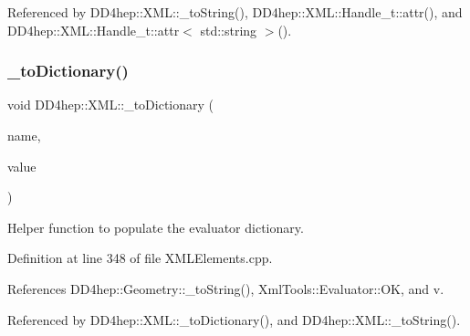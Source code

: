 Referenced by D\+D4hep\+::\+X\+M\+L\+::\+\_\+to\+String(), D\+D4hep\+::\+X\+M\+L\+::\+Handle\+\_\+t\+::attr(), and D\+D4hep\+::\+X\+M\+L\+::\+Handle\+\_\+t\+::attr$<$ std\+::string $>$().

\hypertarget{group___d_d4_h_e_p___x_m_l_ga453206d36ab8257b39337846e5a1795d}{}\label{group___d_d4_h_e_p___x_m_l_ga453206d36ab8257b39337846e5a1795d} 
\subsubsection{\texorpdfstring{\+\_\+to\+Dictionary()}{\_toDictionary()}\hspace{0.1cm}{\footnotesize\ttfamily [1/4]}}
{\footnotesize\ttfamily void D\+D4hep\+::\+X\+M\+L\+::\+\_\+to\+Dictionary (\begin{DoxyParamCaption}\item[{const \hyperlink{namespace_d_d4hep_1_1_x_m_l_a09e5d9cc86ed782f6826dfe0778c1815}{Xml\+Char} $\ast$}]{name,  }\item[{const \hyperlink{namespace_d_d4hep_1_1_x_m_l_a09e5d9cc86ed782f6826dfe0778c1815}{Xml\+Char} $\ast$}]{value }\end{DoxyParamCaption})}



Helper function to populate the evaluator dictionary. 



Definition at line 348 of file X\+M\+L\+Elements.\+cpp.



References D\+D4hep\+::\+Geometry\+::\+\_\+to\+String(), Xml\+Tools\+::\+Evaluator\+::\+OK, and v.



Referenced by D\+D4hep\+::\+X\+M\+L\+::\+\_\+to\+Dictionary(), and D\+D4hep\+::\+X\+M\+L\+::\+\_\+to\+String().

\hypertarget{group___d_d4_h_e_p___x_m_l_ga50eac63a7d1b9077d329298a55c23d5e}{}\label{group___d_d4_h_e_p___x_m_l_ga50eac63a7d1b9077d329298a55c23d5e} 
